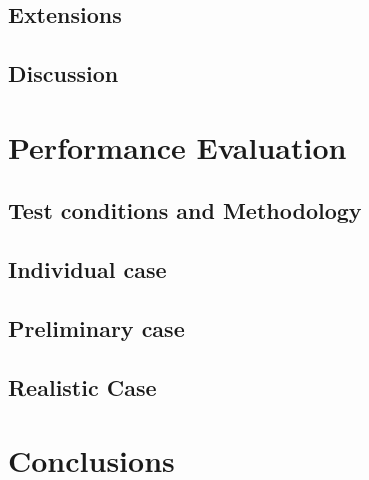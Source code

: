 \documentclass[12pt]{report}
\begin{document}
        
        
    \section{Extensions}
    
        
    
    \section{Discussion}
    
        
        
\chapter{Performance Evaluation}

    
        
    \section{Test conditions and Methodology}
    
        
        
    \section{Individual case}
    
        
    
    \section{Preliminary case}
    
        
    
    \section{Realistic Case}
    
        

\chapter{Conclusions}

    


    
    
\end{document}
